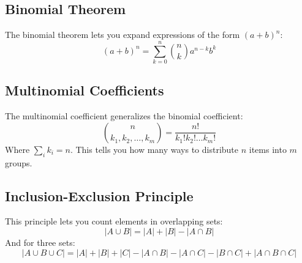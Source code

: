 \subsection{Binomial Theorem}
The binomial theorem lets you expand expressions of the form $(a + b)^n$:
\[
(a + b)^n = \sum_{k=0}^{n} \binom{n}{k} a^{n-k} b^k
\]

\subsection{Multinomial Coefficients}
The multinomial coefficient generalizes the binomial coefficient:
\[
\binom{n}{k_1, k_2, \dots, k_m} = \frac{n!}{k_1! k_2! \dots k_m!}
\]
Where $\sum_i k_i = n$. This tells you how many ways to distribute $n$ items into $m$ groups.

\subsection{Inclusion-Exclusion Principle}
This principle lets you count elements in overlapping sets:
\[
|A \cup B| = |A| + |B| - |A \cap B|
\]
And for three sets:
\[
|A \cup B \cup C| = |A| + |B| + |C| - |A \cap B| - |A \cap C| - |B \cap C| + |A \cap B \cap C|
\]


